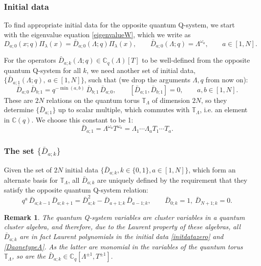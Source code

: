 \documentclass[12pt]{amsart}
\newtheorem{remark}[thm]{Remark}
\newcommand{\C}{{\mathbb C}}
\newcommand{\lL}{{\Lambda}}
\numberwithin{equation}{section}
\begin{document}
%
%
%
%
%
%
%
\subsubsection{Initial data}
To find appropriate initial data for the opposite quantum Q-system, we start with the eigenvalue equation \eqref{eigenvalueW}, which we write as
\begin{equation}\label{initdatazero}
D_{a;0}(x;q) \Pi_\lambda(x) = \bar D_{a;0}(\Lambda;q)\Pi_\lambda(x) ,\qquad \bar D_{a;0} (\Lambda;q) = \Lambda^{\omega_a}, \qquad a\in [1,N].
\end{equation}

For the operators $\bar D_{a;k}(\Lambda;q)\in \C_q(\Lambda)[T]$ to be well-defined from the opposite quantum Q-system for all $k$, we need another set of initial data, $\{\bar D_{a;1}(\Lambda;q),\ a\in[1,N]\}$, such that (we drop the arguments $\lL,q$ from now on):
\begin{equation}\label{oppcr}
\bar D_{a;0}\, \bar D_{b;1} = q^{-\min(a,b)}\, \bar D_{b;1}\,\bar D_{a;0},\qquad [\bar D_{a;1}, \bar D_{b;1}]=0,\qquad a,b\in[1,N].
\end{equation}
These are $2N$ relations on the quantum torus $\mathbb T_\Lambda$ of dimension $2N$, so they determine 
$\{\bar D_{a;1}\}$ up to scalar multiple, which commutes with $\mathbb T_\Lambda$, i.e. an element in $\C(q)$. We choose this constant to be 1:
\begin{equation}\label{DaonetypeA}
\bar D_{a;1} = \Lambda^{\omega_a} T^{\omega_a} = \Lambda_1\cdots \Lambda_a T_1 \cdots T_a.
\end{equation}

\subsubsection{The set $\{\bar D_{a;k}\}$}
Given the set of $2N$ initial data $\{\bar D_{a;k}, k\in\{0,1\}, a\in[1,N]\}$, which form an alternate basis for $\mathbb T_\Lambda$,  all $\bar D_{a;k}$ are uniquely defined by the requirement that they satisfy the opposite quantum Q-system relation:
%
\begin{equation}\label{oppositeQ}
q^{a}\,\bar {D}_{a;k-1}\,\bar D_{a;k+1}= \bar {D}^2_{a;k} - \bar D_{a+1;k}\,\bar D_{a-1;k} , \qquad \bar D_{0;k}=1,\ \bar D_{N+1;k}=0.
\end{equation}

\begin{remark}
The quantum Q-system variables are cluster variables in a quantum cluster algebra, and therefore, due to the Laurent property of these algebras, all $\bar D_{a;k}$ are in fact Laurent polynomials in the initial data \eqref{initdatazero} and \eqref{DaonetypeA}. As the latter are monomial in the
variables of the quantum torus $\mathbb T_\Lambda$, so are the $\bar D_{a;k}\in \C_q[\Lambda^{\pm1}, T^{\pm1}]$.
\end{remark}
\end{document}
